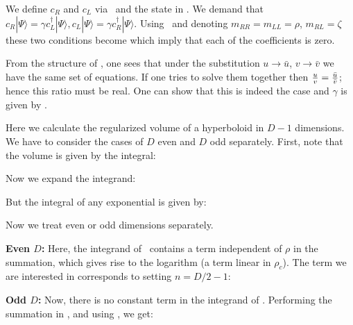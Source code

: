 We define $c_R$ and $c_L$ via \bogol\ and the state in \finalc . We demand that
 $c_R | \Psi \rangle = \gamma c^\dagger_L | \Psi \rangle, c_L | \Psi \rangle = \gamma c^\dagger_R | \Psi \rangle$.
Using \bogol\ and
denoting $m_{RR}=m_{LL}=\rho$, $m_{RL}= \zeta $ these two conditions become
\eqn{}
which imply that each of the coefficients is zero.

From the structure of \conds , one sees that under the substitution $u \to \bar u$, $v \to \bar v$ we have the same set of equations. If one tries to solve them together then ${u \over v} = {\bar u \over \bar v}$; hence this ratio must be real. One can show that this is indeed the case and $\gamma$  is given by \eigen .


Here we calculate the regularized volume of a hyperboloid in $D-1$ dimensions. We have to consider the cases of $D$ even and $D$ odd separately. First, note that the volume is given by the integral:
\eqn{}

Now we expand the integrand:
\eqn{}

But the integral of any exponential is given by:
\eqn{}

Now we treat even or odd dimensions separately.

{\bf Even $D$:} Here, the integrand of \volexp\ contains a 
 term independent of $\rho$ in the summation, which gives rise to 
  the logarithm (a term linear in $\rho_c$). 
  The term we are interested in corresponds to setting $n=D/2 -1$:
\eqn{}

{\bf Odd $D$:} Now, there is no constant term in the integrand of \volexp . 
Performing the summation in \volexp , and using \expint , we get:
\eqn{}

